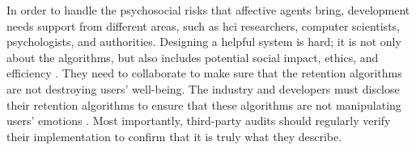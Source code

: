 In order to handle the psychosocial risks that affective agents bring, development needs support from different areas, such as \gls{hci} researchers, computer scientists, psychologists, and authorities. Designing a helpful system is hard; it is not only about the algorithms, but also includes potential social impact, ethics, and efficiency \cite[pp.~4--6]{cheng_measuring_2026}. They need to collaborate to make sure that the retention algorithms are not destroying users' well-being.
The industry and developers must disclose their retention algorithms to ensure that these algorithms are not manipulating users' emotions \cite[pp.~15--18]{defreitas_emotional_2025}. Most importantly, third-party audits should regularly verify their implementation to confirm that it is truly what they describe.
